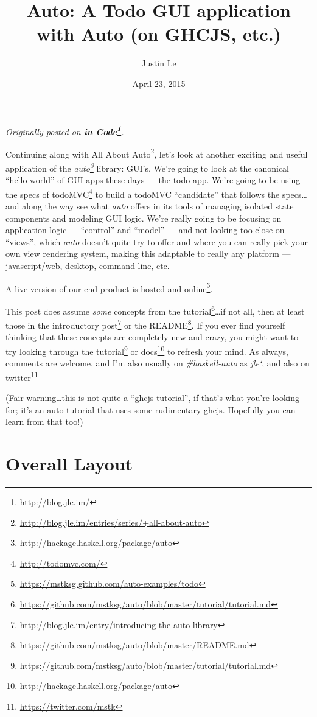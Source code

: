 \documentclass[]{article}
\title{Auto: A Todo GUI application with Auto (on GHCJS, etc.)}
\author{Justin Le}
\date{April 23, 2015}
\renewcommand{\href}[2]{#2\footnote{\url{#1}}}
\begin{document}
\maketitle

\emph{Originally posted on \textbf{\href{http://blog.jle.im/}{in
Code}}.}

Continuing along with
\href{http://blog.jle.im/entries/series/+all-about-auto}{All About
Auto}, let's look at another exciting and useful application of the
\emph{\href{http://hackage.haskell.org/package/auto}{auto}} library:
GUI's. We're going to look at the canonical ``hello world'' of GUI apps
these days --- the todo app. We're going to be using the specs of
\href{http://todomvc.com/}{todoMVC} to build a todoMVC ``candidate''
that follows the specs\ldots{}and along the way see what \emph{auto}
offers in its tools of managing isolated state components and modeling
GUI logic. We're really going to be focusing on application logic ---
``control'' and ``model'' --- and not looking too close on ``views'',
which \emph{auto} doesn't quite try to offer and where you can really
pick your own view rendering system, making this adaptable to really any
platform --- javascript/web, desktop, command line, etc.

A live version of our end-product
\href{https://mstksg.github.com/auto-examples/todo}{is hosted and
online}.

This post does assume \emph{some} concepts from the
\href{https://github.com/mstksg/auto/blob/master/tutorial/tutorial.md}{tutorial}\ldots{}if
not all, then at least those in the
\href{http://blog.jle.im/entry/introducing-the-auto-library}{introductory
post} or the
\href{https://github.com/mstksg/auto/blob/master/README.md}{README}. If
you ever find yourself thinking that these concepts are completely new
and crazy, you might want to try looking through the
\href{https://github.com/mstksg/auto/blob/master/tutorial/tutorial.md}{tutorial}
or \href{http://hackage.haskell.org/package/auto}{docs} to refresh your
mind. As always, comments are welcome, and I'm also usually on
\emph{\#haskell-auto} as \emph{jle`}, and also on
\href{https://twitter.com/mstk}{twitter}

(Fair warning\ldots{}this is not quite a ``ghcjs tutorial'', if that's
what you're looking for; it's an auto tutorial that uses some
rudimentary ghcjs. Hopefully you can learn from that too!)

\section{Overall Layout}\label{overall-layout}
\end{document}
